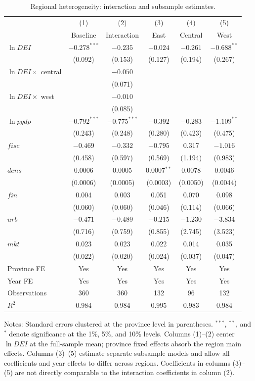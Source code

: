 \documentclass[economies,article,submit,moreauthors]{Definitions/mdpi}
\begin{document}
\begin{table}[H]
\centering
\caption{Regional heterogeneity: interaction and subsample estimates.}
\label{tab:region}
\footnotesize
\setlength{\tabcolsep}{4pt}
\begin{threeparttable}
\begin{tabular}{lccccc}
\toprule
 & (1) & (2) & (3) & (4) & (5)\\
 & Baseline & Interaction & East & Central & West\\
\midrule
$\ln DEI$ & $-0.278^{***}$ & $-0.235$ & $-0.024$ & $-0.261$ & $-0.688^{**}$\\
 & (0.092) & (0.153) & (0.127) & (0.194) & (0.267)\\
$\ln DEI\times$ central & & $-0.050$ & & & \\
 & & (0.071) & & & \\
$\ln DEI\times$ west & & $-0.010$ & & & \\
 & & (0.085) & & & \\
\midrule
$\ln pgdp$ & $-0.792^{***}$ & $-0.775^{***}$ & $-0.392$ & $-0.283$ & $-1.109^{**}$\\
 & (0.243) & (0.248) & (0.280) & (0.423) & (0.475)\\
$fisc$ & $-0.469$ & $-0.332$ & $-0.795$ & 0.317 & $-1.016$\\
 & (0.458) & (0.597) & (0.569) & (1.194) & (0.983)\\
$dens$ & 0.0006 & 0.0005 & 0.0007$^{**}$ & 0.0078 & 0.0046\\
 & (0.0006) & (0.0005) & (0.0003) & (0.0050) & (0.0044)\\
$fin$ & 0.004 & 0.003 & 0.051 & 0.070 & 0.098\\
 & (0.060) & (0.060) & (0.046) & (0.114) & (0.066)\\
$urb$ & $-0.471$ & $-0.489$ & $-0.215$ & $-1.230$ & $-3.834$\\
 & (0.716) & (0.759) & (0.855) & (2.745) & (3.523)\\
$mkt$ & 0.023 & 0.023 & 0.022 & 0.014 & 0.035\\
 & (0.022) & (0.020) & (0.024) & (0.037) & (0.047)\\
\midrule
Province FE & Yes & Yes & Yes & Yes & Yes\\
Year FE & Yes & Yes & Yes & Yes & Yes\\
Observations & 360 & 360 & 132 & 96 & 132\\
$R^2$ & 0.984 & 0.984 & 0.995 & 0.983 & 0.984\\
\bottomrule
\end{tabular}
\begin{tablenotes}\footnotesize
\item Notes: Standard errors clustered at the province level in parentheses. $^{***}$, $^{**}$, and $^{*}$ denote significance at the 1\%, 5\%, and 10\% levels. Columns (1)--(2) center $\ln DEI$ at the full-sample mean; province fixed effects absorb the region main effects. Columns (3)--(5) estimate separate subsample models and allow all coefficients and year effects to differ across regions. Coefficients in columns (3)--(5) are not directly comparable to the interaction coefficients in column (2).
\end{tablenotes}
\end{threeparttable}
\end{table}
\end{document}
